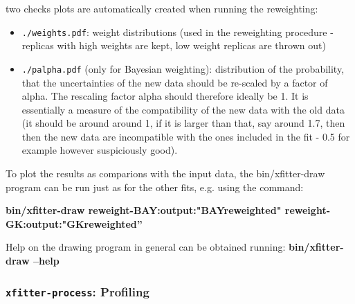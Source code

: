   two checks plots are automatically created when running the reweighting:
\begin{itemize}
\item {\tt ./weights.pdf}: weight distributions (used in the reweighting procedure - replicas with high 
 weights are kept, low weight replicas are thrown out)

\item {\tt ./palpha.pdf} (only for Bayesian weighting): distribution of the probability, that the uncertainties 
 of the new data should be re-scaled by a factor of alpha. The rescaling factor alpha should 
 therefore ideally be 1. It is essentially a measure of the compatibility of 
 the new data with the old data (it should be around around 1, if it is larger than that, 
 say around 1.7, then then the new data are incompatible with the ones included in the 
 fit - 0.5 for example however suspiciously good).
\end{itemize}

To plot the results as comparions with the input data, the bin/xfitter-draw program can be run just as for the other fits, e.g. using the command:
 
\textbf{bin/xfitter-draw reweight-BAY:output:"BAYreweighted" reweight-GK:output:"GKreweighted''}

Help on the drawing program in general can be obtained running:
\textbf{bin/xfitter-draw --help}

\subsubsection{{\tt xfitter-process}: Profiling}


